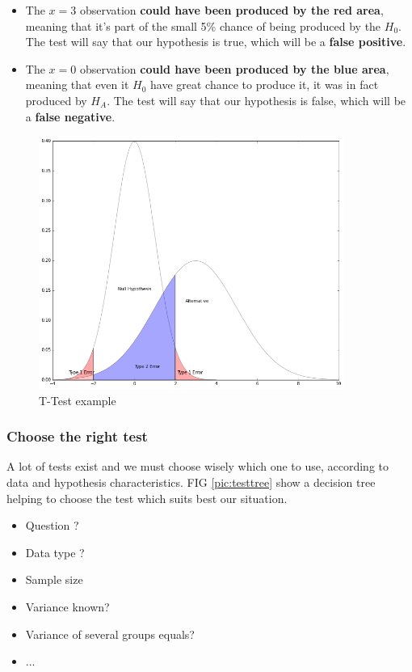 \begin{itemize}
	\item The $x=3$ observation \textbf{could have been produced by the red area}, meaning that it's part of the small 5\% chance of being produced by the $H_0$. The test will say that our hypothesis is true, which will be a \textbf{false positive}.

	\item The $x=0$ observation \textbf{could have been produced by the blue area}, meaning that even it $H_0$ have great chance to produce it, it was in fact produced by $H_A$.  The test will say that our hypothesis is false, which will be a \textbf{false negative}.
\end{itemize}

\begin{figure}[h]%
 \centering
 \includegraphics[width=10cm]{./img/05/t-test}
 \caption{\label{pic:ttest} T-Test example}
\end{figure}

\subsubsection{Choose the right test}

A lot of tests exist and we must choose wisely which one to use, according to data and hypothesis characteristics. FIG \ref{pic:testtree} show a decision tree helping to choose the test which suits best our situation.

\begin{itemize}
 \item Question ? 
 \item Data type ?
 \item Sample size
 \item Variance known? 
 \item Variance of several groups equals?
 \item ...
\end{itemize}

